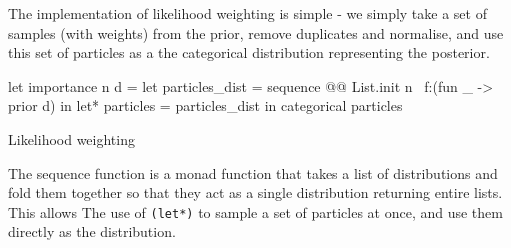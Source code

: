The implementation of likelihood weighting is simple - we simply take a set of samples (with weights) from the prior, remove duplicates and normalise, and use this set of particles as a the categorical distribution representing the posterior.
	\begin{listing}[!htb]
		\centering
		\begin{ocamlcode-in}
let importance n d = 
let particles_dist = sequence @@ List.init n ~f:(fun _ -> prior d) in
let* particles = particles_dist in 
categorical particles
		\end{ocamlcode-in}
		\caption{Likelihood weighting}
		\label{lst:imp}
	\end{listing}
	
The sequence function is a monad function that takes a list of distributions and fold them together so that they act as a single distribution returning entire lists. This allows The use of \texttt{(let*)} to sample a set of particles at once, and use them directly as the distribution.
	
